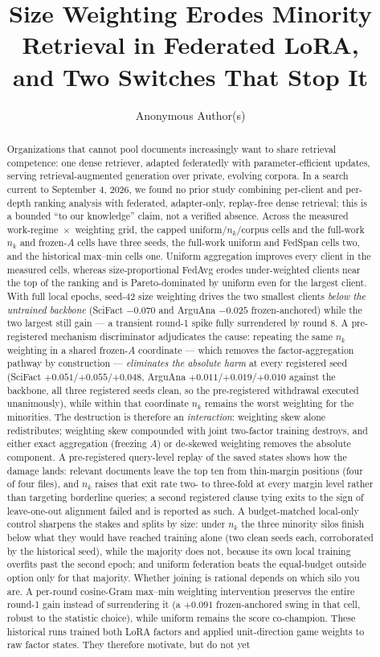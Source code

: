 \documentclass[sigconf,anonymous,review]{acmart}
\title[Size Weighting Erodes Minority Retrieval in Federated LoRA]{Size Weighting Erodes Minority Retrieval in Federated {LoRA},\\ and Two Switches That Stop It}
\author{Anonymous Author(s)}
\affiliation{\institution{Anonymous Institution}\city{}\country{}}
\begin{document}
\begin{abstract}
Organizations that cannot pool documents increasingly want to share retrieval competence: one dense retriever, adapted federatedly with parameter-efficient updates, serving retrieval-augmented generation over private, evolving corpora. In a search current to September 4, 2026, we found no prior study combining per-client and per-depth ranking analysis with federated, adapter-only, replay-free dense retrieval; this is a bounded ``to our knowledge'' claim, not a verified absence. Across the measured work-regime~$\times$~weighting grid, the capped uniform/$n_k$/corpus cells and the full-work $n_k$ and frozen-$A$ cells have three seeds, the full-work uniform and FedSpan cells two, and the historical max--min cells one. Uniform aggregation improves every client in the measured cells, whereas size-proportional FedAvg erodes under-weighted clients near the top of the ranking and is Pareto-dominated by uniform even for the largest client. With full local epochs, seed-42 size weighting drives the two smallest clients \emph{below the untrained backbone} (SciFact $-0.070$ and ArguAna $-0.025$ frozen-anchored) while the two largest still gain --- a transient round-1 spike fully surrendered by round 8. A pre-registered mechanism discriminator adjudicates the cause: repeating the same $n_k$ weighting in a shared frozen-$A$ coordinate --- which removes the factor-aggregation pathway by construction --- \emph{eliminates the absolute harm} at every registered seed (SciFact $+0.051$/$+0.055$/$+0.048$, ArguAna $+0.011$/$+0.019$/$+0.010$ against the backbone, all three registered seeds clean, so the pre-registered withdrawal executed unanimously), while within that coordinate $n_k$ remains the worst weighting for the minorities. The destruction is therefore an \emph{interaction}: weighting skew alone redistributes; weighting skew compounded with joint two-factor training destroys, and either exact aggregation (freezing $A$) or de-skewed weighting removes the absolute component. A pre-registered query-level replay of the saved states shows how the damage lands: relevant documents leave the top ten from thin-margin positions (four of four files), and $n_k$ raises that exit rate two- to three-fold at every margin level rather than targeting borderline queries; a second registered clause tying exits to the sign of leave-one-out alignment failed and is reported as such. A budget-matched local-only control sharpens the stakes and splits by size: under $n_k$ the three minority silos finish below what they would have reached training alone (two clean seeds each, corroborated by the historical seed), while the majority does not, because its own local training overfits past the second epoch; and uniform federation beats the equal-budget outside option only for that majority. Whether joining is rational depends on which silo you are. A per-round cosine-Gram max--min weighting intervention preserves the entire round-1 gain instead of surrendering it (a $+0.091$ frozen-anchored swing in that cell, robust to the statistic choice), while uniform remains the score co-champion. These historical runs trained both LoRA factors and applied unit-direction game weights to raw factor states. They therefore motivate, but do not yet 
\end{abstract}
\end{document}
